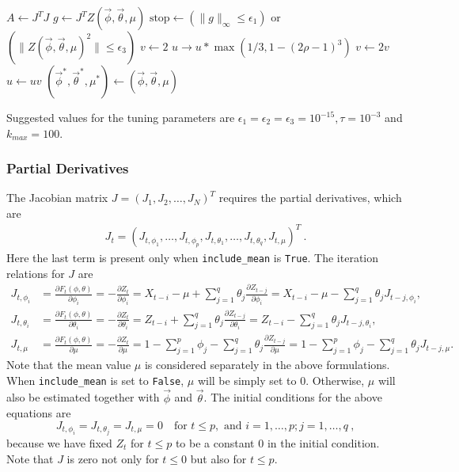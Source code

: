 \begin{algorithm}
\begin{algorithmic}[1]
					\State $A \leftarrow J^T J$
					\State $g \leftarrow J^T Z(\vec{\phi},\vec{\theta},\mu)$
					\State $ \text{stop} \leftarrow (\|g\|_{\infty} \le \epsilon_1)$ or $(\| Z(\vec{\phi},\vec{\theta},\mu)^2 \| \le \epsilon_3)$  
					\State $v \leftarrow 2$
					\State $u \rightarrow u * \max(1/3, 1 - (2\rho - 1)^3 )$
				\Else  {}
					\State $v \leftarrow 2 v$
					\State $u \leftarrow u v$
				\EndIf
			\EndIf
	\EndWhile
	\State $(\vec{\phi}^*,\vec{\theta}^*,\mu^*) \leftarrow (\vec{\phi},\vec{\theta},\mu)$
\end{algorithmic}
\label{alg: Levenberg-Marquardt}
\end{algorithm}

Suggested values for the tuning parameters are $\epsilon_1 = \epsilon_2 = \epsilon_3 = 10^{-15}, \tau = 10^{-3}$ and $k_{max} = 100$.
\subsubsection{Partial Derivatives}\label{sec:partial der}
The Jacobian matrix $J = (J_{1}, J_{2}, \dots, J_N)^T$ requires the partial derivatives, which are
\begin{align}
J_t = (J_{t, \phi_1}, \dots, J_{t,\phi_p}, J_{t,\theta_1}, \dots,
J_{t,\theta_q}, J_{t,\mu})^T\ .
\end{align}
Here the last term is present only when \texttt{include\_mean} is
\texttt{True}.
The iteration relations for $J$ are
\begin{align}
J_{t, \phi_i} &= \frac{\partial F_t(\phi,\theta)}{\partial \phi_i} =
-\frac{\partial Z_t}{\partial \phi_i} = X_{t-i}-\mu + \sum_{j=1}^q
\theta_j \frac{\partial Z_{t - j}}{\partial \phi_i} = X_{t-i}-\mu - \sum_{j=1}^q
\theta_j J_{t-j,\phi_i}, \\
J_{t, \theta_i}&=\frac{\partial F_t(\phi,\theta)}{\partial \theta_i} =
-\frac{\partial Z_t}{\partial \theta_i} = Z_{t-i} + \sum_{j =1}^q
\theta_j \frac{\partial Z_{t - j}}{\partial \theta_i} = Z_{t-i} -
\sum_{j=1}^q \theta_j J_{t-j,\theta_i}, \\
J_{t, \mu} &=\frac{\partial F_t(\phi,\theta)}{\partial \mu} =
-\frac{\partial Z_t}{\partial \mu} = 1 -
\sum_{j=1}^p \phi_j - \sum_{j=1}^q \theta_j \frac{\partial
  Z_{t-j}}{\partial \mu} = 1 - \sum_{j=1}^p \phi_j - \sum_{j=1}^q
\theta_j J_{t-j,\mu}.
\end{align}
Note that the mean value $\mu$ is considered separately in the above
formulations. When \texttt{include\_mean} is set to \texttt{False}, $\mu$ will be simply
set to 0. Otherwise, $\mu$ will also be estimated together with
$\vec{\phi}$ and $\vec{\theta}$. The initial conditions for the above
equations are
\begin{equation}
J_{t,\phi_i} = J_{t,\theta_j} = J_{t,\mu} = 0 \quad \mbox{for }
t \leq p, \mbox{ and } i=1,\dots,p; j = 1, \dots, q\ ,
\end{equation}
because we have fixed $Z_t$ for $t\leq p$ to be a constant $0$ in the initial
condition. Note that $J$ is zero not only for $t\leq
0$ but also for $t\leq p$.

